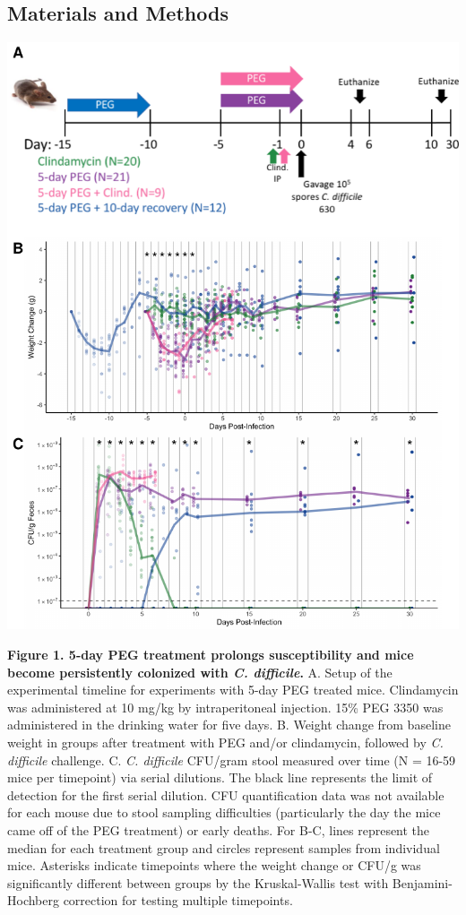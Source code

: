 \documentclass[
  11pt,
]{article}
\begin{document}
\hypertarget{materials-and-methods}{%
\subsection{Materials and Methods}\label{materials-and-methods}}

\newpage

\includegraphics{figure_1.pdf}

\textbf{Figure 1. 5-day PEG treatment prolongs susceptibility and mice
become persistently colonized with \emph{C. difficile}.} A. Setup of the
experimental timeline for experiments with 5-day PEG treated mice.
Clindamycin was administered at 10 mg/kg by intraperitoneal injection.
15\% PEG 3350 was administered in the drinking water for five days. B.
Weight change from baseline weight in groups after treatment with PEG
and/or clindamycin, followed by \emph{C. difficile} challenge. C.
\emph{C. difficile} CFU/gram stool measured over time (N = 16-59 mice
per timepoint) via serial dilutions. The black line represents the limit
of detection for the first serial dilution. CFU quantification data was
not available for each mouse due to stool sampling difficulties
(particularly the day the mice came off of the PEG treatment) or early
deaths. For B-C, lines represent the median for each treatment group and
circles represent samples from individual mice. Asterisks indicate
timepoints where the weight change or CFU/g was significantly different
between groups by the Kruskal-Wallis test with Benjamini-Hochberg
correction for testing multiple timepoints. \newpage
\end{document}
